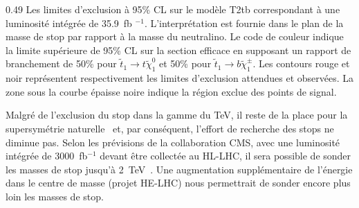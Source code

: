                  {0.49}       %
                 {Les limites d'exclusion à 95\% CL sur le modèle T2tb correspondant à une luminosité intégrée de 35.9~fb $^{-1}$. L'interprétation est fournie dans le plan de la masse de stop par rapport à la masse du neutralino. Le code de couleur indique la limite supérieure de 95\% CL sur la section efficace en supposant un rapport de branchement de 50\% pour $\tilde{t}_{1} \to t \tilde {\chi}^{0}_{1} $ et 50\% pour $\tilde{t}_{1} \to b \tilde{\chi}^{\pm}_{1} $. Les contours rouge et noir représentent respectivement les limites d'exclusion attendues et observées. La zone sous la courbe épaisse noire indique la région exclue des points de signal. }



Malgré de l’exclusion du stop dans la gamme du TeV, il reste de la place pour la supersymétrie naturelle~\cite{Baer:2016bwh} et, par conséquent, l’effort de recherche des stops ne diminue pas. Selon les prévisions de la collaboration CMS, avec une luminosité intégrée de 3000~fb$^{-1} $ devant être collectée au HL-LHC, il sera possible de sonder les masses de stop jusqu'à 2~TeV~\cite{website:moriond}. Une augmentation supplémentaire de l’énergie dans le centre de masse (projet HE-LHC)  nous permettrait de sonder encore plus loin les masses de stop.


